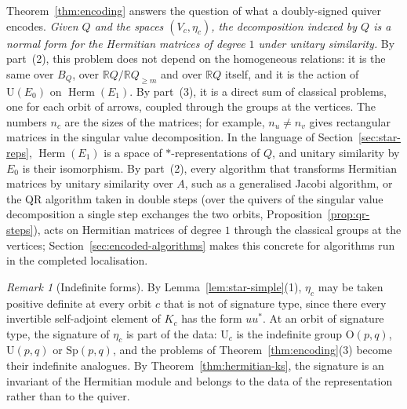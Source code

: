 \documentclass[12pt, a4paper]{report}
\theoremstyle{plain}
\theoremstyle{definition}
\theoremstyle{remark}
\newtheorem{remark}[theorem]{Remark}
\theoremstyle{plain}
\newcommand{\RR}{\mathbb{R}}
\newcommand{\Or}{\mathrm{O}}
\newcommand{\Un}{\mathrm{U}}
\newcommand{\Sp}{\mathrm{Sp}}
\newcommand{\Herm}{\operatorname{Herm}}
\begin{document}
Theorem~\ref{thm:encoding} answers the question of what a doubly-signed quiver encodes. \emph{Given $Q$ and the spaces $(V_c,\eta_c)$, the decomposition indexed by $Q$ is a normal form for the Hermitian matrices of degree $1$ under unitary similarity.} By part~(2), this problem does not depend on the homogeneous relations: it is the same over $B_Q$, over $\RR Q/\RR Q_{\geq m}$ and over $\RR Q$ itself, and it is the action of $\Un(E_0)$ on $\Herm(E_1)$. By part~(3), it is a direct sum of classical problems, one for each orbit of arrows, coupled through the groups at the vertices. The numbers $n_c$ are the sizes of the matrices; for example, $n_u\neq n_v$ gives rectangular matrices in the singular value decomposition. In the language of Section~\ref{sec:star-reps}, $\Herm(E_1)$ is a space of $*$-representations of $Q$, and unitary similarity by $E_0$ is their isomorphism. By part~(2), every algorithm that transforms Hermitian matrices by unitary similarity over $A$, such as a generalised Jacobi algorithm, or the QR algorithm taken in double steps (over the quivers of the singular value decomposition a single step exchanges the two orbits, Proposition~\ref{prop:qr-steps}), acts on Hermitian matrices of degree $1$ through the classical groups at the vertices; Section~\ref{sec:encoded-algorithms} makes this concrete for algorithms run in the completed localisation.

\begin{remark}[Indefinite forms]\label{rem:indefinite}
By Lemma~\ref{lem:star-simple}(1), $\eta_c$ may be taken positive definite at every orbit $c$ that is not of signature type, since there every invertible self-adjoint element of $K_c$ has the form $uu^*$. At an orbit of signature type, the signature of $\eta_c$ is part of the data: $\Un_c$ is the indefinite group $\Or(p,q)$, $\Un(p,q)$ or $\Sp(p,q)$, and the problems of Theorem~\ref{thm:encoding}(3) become their indefinite analogues. By Theorem~\ref{thm:hermitian-ks}, the signature is an invariant of the Hermitian module and belongs to the data of the representation rather than to the quiver.
\end{remark}
\end{document}

